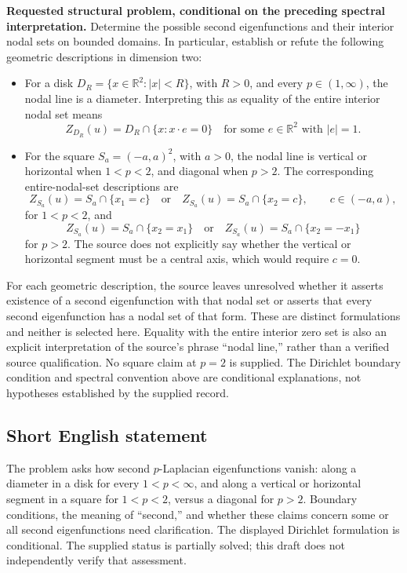 \documentclass[11pt]{article}
\newcommand{\R}{\mathbb{R}}
\begin{document}
\textbf{Requested structural problem, conditional on the preceding spectral interpretation.} Determine the possible second eigenfunctions and their interior nodal sets on bounded domains. In particular, establish or refute the following geometric descriptions in dimension two:
\begin{itemize}
\item For a disk \(D_R=\{x\in\R^2:|x|<R\}\), with \(R>0\), and every \(p\in(1,\infty)\), the nodal line is a diameter. Interpreting this as equality of the entire interior nodal set means
\[
Z_{D_R}(u)=D_R\cap\{x:x\cdot e=0\}
\quad\text{for some }e\in\R^2\text{ with }|e|=1.
\]
\item For the square \(S_a=(-a,a)^2\), with \(a>0\), the nodal line is vertical or horizontal when \(1<p<2\), and diagonal when \(p>2\). The corresponding entire-nodal-set descriptions are
\[
Z_{S_a}(u)=S_a\cap\{x_1=c\}
\quad\text{or}\quad
Z_{S_a}(u)=S_a\cap\{x_2=c\},\qquad c\in(-a,a),
\]
for \(1<p<2\), and
\[
Z_{S_a}(u)=S_a\cap\{x_2=x_1\}
\quad\text{or}\quad
Z_{S_a}(u)=S_a\cap\{x_2=-x_1\}
\]
for \(p>2\). The source does not explicitly say whether the vertical or horizontal segment must be a central axis, which would require \(c=0\).
\end{itemize}
For each geometric description, the source leaves unresolved whether it asserts existence of a second eigenfunction with that nodal set or asserts that every second eigenfunction has a nodal set of that form. These are distinct formulations and neither is selected here. Equality with the entire interior zero set is also an explicit interpretation of the source's phrase ``nodal line,'' rather than a verified source qualification. No square claim at \(p=2\) is supplied. The Dirichlet boundary condition and spectral convention above are conditional explanations, not hypotheses established by the supplied record.
\subsection{Short English statement}
The problem asks how second \(p\)-Laplacian eigenfunctions vanish: along a diameter in a disk for every \(1<p<\infty\), and along a vertical or horizontal segment in a square for \(1<p<2\), versus a diagonal for \(p>2\). Boundary conditions, the meaning of ``second,'' and whether these claims concern some or all second eigenfunctions need clarification. The displayed Dirichlet formulation is conditional. The supplied status is partially solved; this draft does not independently verify that assessment.
\end{document}
